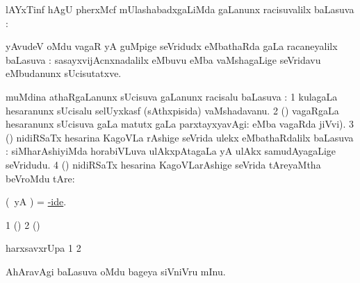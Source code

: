 \bentry
{}
\gl{\uparx}
\bmng
lAYxTinf hAgU pherxMcf mUlashabadxgaLiMda \gu gaLanunx racisuvalilx baLasuva \uparx:  
\emng
\eentry

\bentry
{}
\gl{\uparx}
\bmng
yAvudeV oMdu vagaR yA guMpige seVridudx eMbathaRda \nA gaLa racaneyalilx baLasuva \uparx: sasayxvijAcnxnadalilx  eMbuvu  eMba vaMshagaLige seVridavu eMbudanunx sUcisutatxve. 
\emng
\eentry

\bentry
{}
\gl{\uparx}
\bmng
muMdina athaRgaLanunx sUcisuva \nA gaLanunx racisalu baLasuva \uparx: 
\bnum
\num{1} kulagaLa hesaranunx sUcisalu  selUyxkasf (sAthxpisida) vaMshadavanu. 
\num{2} (\pArxvi) vagaRgaLa hesaranunx sUcisuva \nA gaLa matutx \gu gaLa parxtayxyavAgi:  eMba vagaRda jiVvi). 
\num{3} (\Kavi) nidiRSaTx hesarina KagoVLa rAshige seVrida ulekx eMbathaRdalilx baLasuva \uparx:  siMharAshiyiMda horabiVLuva ulAkxpAtagaLa yA ulAkx samudAyagaLige seVridudu. 
\num{4} (\Kavi) nidiRSaTx hesarina KagoVLarAshige seVrida tAreyaMtha beVroMdu tAre:  
\enum
\emng
\eentry

\bentry
{}
\gl{\uparx}
\bmng
(\ame\ yA \pArxparx)  = \hyperlink{hyp-ide}{-ide}. 
\emng
\eentry

\bentry
{}
\gl{\saMkiSx}
\bmng
\bnum
\num{1} (\ame)  
\num{2} (\ame)  
\enum
\emng
\eentry

\bentry
{}
\gl{\saMkiSx}
\bmng
{} 
\emng
\eentry

\bentry
{}
\gl{\saMkiSx}
\bmng
{} 
\emng
\eentry

\bentry
{}
\bmng
harxsavxrUpa 
\bnum
\num{1}  
\num{2}  
\enum
\emng
\eentry

\bentry
{}
\gl{\saMkiSx}
\bmng
{} 
\emng
\eentry

\bentry
{}
\gl{\saMkiSx}
\bmng
{} 
\emng
\eentry

\bentry
{}
\gl{\nA}
\bmng
AhAravAgi baLasuva oMdu bageya siVniVru mInu. 
\emng
\eentry

